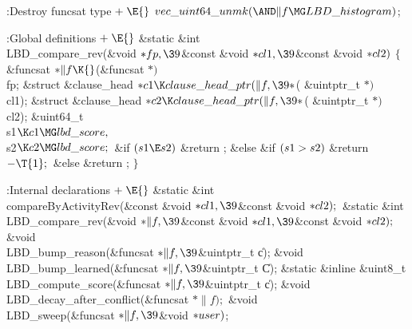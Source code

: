 {{{{{
\Y\B\4:Destroy funcsat type\X${}\mathrel+\E{}$\6
$\\{vec\_uint64\_unmk}({\AND}\|f\MG\\{LBD\_histogram}){}$;\par
\fi

\Y\B\4:Global definitions\X${}\mathrel+\E{}$\6
\&{static} \&{int} \\{LBD\_compare\_rev}(\&{void} ${}{*}\\{fp},\39{}$\&{const} %
\&{void} ${}{*}\\{cl1},\39{}$\&{const} \&{void} ${}{*}\\{cl2}){}$\1\1\2\2\6
${}\{{}$\1\6
\&{funcsat} ${}{*}\|f\K{}$(\&{funcsat} ${}{*}){}$ \\{fp};\6
\&{struct} \&{clause\_head} ${}{*}\\{c1}\K\\{clause\_head\_ptr}(\|f,\39{*}{}$(%
\&{uintptr\_t} ${}{*}){}$ \\{cl1});\6
\&{struct} \&{clause\_head} ${}{*}\\{c2}\K\\{clause\_head\_ptr}(\|f,\39{*}{}$(%
\&{uintptr\_t} ${}{*}){}$ \\{cl2});\6
\&{uint64\_t} \\{s1}${}\K\\{c1}\MG\\{lbd\_score},{}$ \\{s2}${}\K\\{c2}\MG\\{lbd%
\_score};{}$\7
\&{if} ${}(\\{s1}\E\\{s2}){}$\1\5
\&{return} ;\2\6
\&{else} \&{if} ${}(\\{s1}>\\{s2}){}$\1\5
\&{return} ${}{-}\T{1};{}$\2\6
\&{else}\1\5
\&{return} ;\2\6
\4${}\}{}$\2\par
\fi

\Y\B\4:Internal declarations\X${}\mathrel+\E{}$\6
\&{static} \&{int} \\{compareByActivityRev}(\&{const} \&{void} ${}{*}\\{cl1},%
\39{}$\&{const} \&{void} ${}{*}\\{cl2});{}$\6
\&{static} \&{int} \\{LBD\_compare\_rev}(\&{void} ${}{*}\|f,\39{}$\&{const} %
\&{void} ${}{*}\\{cl1},\39{}$\&{const} \&{void} ${}{*}\\{cl2});{}$\6
\&{void} \\{LBD\_bump\_reason}(\&{funcsat} ${}{*}\|f,\39{}$\&{uintptr\_t} \|c);%
\6
\&{void} \\{LBD\_bump\_learned}(\&{funcsat} ${}{*}\|f,\39{}$\&{uintptr\_t} %
\|C);\6
\&{static} \&{inline} \&{uint8\_t} \\{LBD\_compute\_score}(\&{funcsat} ${}{*}%
\|f,\39{}$\&{uintptr\_t} \|c);\6
\&{void} \\{LBD\_decay\_after\_conflict}(\&{funcsat} ${}{*}\|f);{}$\6
\&{void} \\{LBD\_sweep}(\&{funcsat} ${}{*}\|f,\39{}$\&{void} ${}{*}%
\\{user}){}$;\par
\fi

}}}}}
